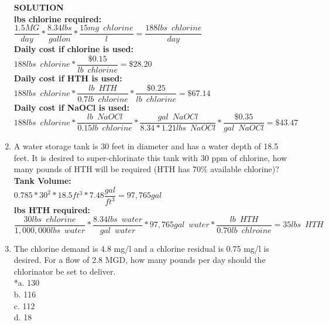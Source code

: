 \begin{enumerate}
\vspace{0.25cm}
\textbf{SOLUTION}\\
\textbf{lbs chlorine required:}\\
$\dfrac{1.5 MG}{day}*\dfrac{8.34lbs}{gallon}*\dfrac{15mg \enspace chlorine}{l}=\dfrac{188 lbs \enspace chlorine}{day}$\\
\vspace{0.25cm}
\textbf{Daily cost if chlorine is used:}\\
$188lbs \enspace chlorine*\dfrac{\$0.15}{lb \enspace chlorine}=\boxed{\$28.20}$\\
\vspace{0.25cm}
\textbf{Daily cost if HTH is used:}\\
$188lbs \enspace chlorine*\dfrac{lb \enspace HTH}{0.7lb \enspace chlorine}*\dfrac{\$0.25}{lb \enspace chlorine}=\boxed{\$67.14}$\\
\vspace{0.25cm}
\textbf{Daily cost if NaOCl is used:}\\
$188lbs \enspace chlorine*\dfrac{lb \enspace NaOCl}{0.15lb \enspace chlorine}*\dfrac{gal \enspace NaOCl}{8.34*1.21 lbs\enspace NaOCl}*\dfrac{\$0.35}{gal \enspace NaOCl}=\boxed{\$43.47}$
\pagebreak
\item A water storage tank is 30 feet in diameter and has a water depth of 18.5 feet. It is desired to super-chlorinate this tank with 30 ppm of chlorine, how many pounds of HTH will be required (HTH has 70\% available chlorine)?\\    
\vspace{0.25cm}
\textbf{Tank Volume:}\\
$0.785*30^2*18.5ft^3*7.48\dfrac{gal}{ft^3}=97,765 gal$\\
\vspace{0.25cm}
\textbf{lbs HTH required:}\\
$\dfrac{30lbs \enspace chlorine}{1,000,000lbs  \enspace water}*\dfrac{8.34lbs \enspace water}{gal \enspace water}*97,765 gal \enspace water *\dfrac{lb \enspace HTH}{0.70lb \enspace chlroine}=\boxed{35 lbs \enspace HTH}$
\vspace{0.25cm}
\item The chlorine demand is 4.8 mg/l and a chlorine residual is 0.75 mg/l is desired.  For a flow of 2.8 MGD, how many pounds per day should the chlorinator be set to deliver.\\
*a. 130 \\
b. 116 \\
c. 112 \\
d. 18 \\

\end{enumerate}
